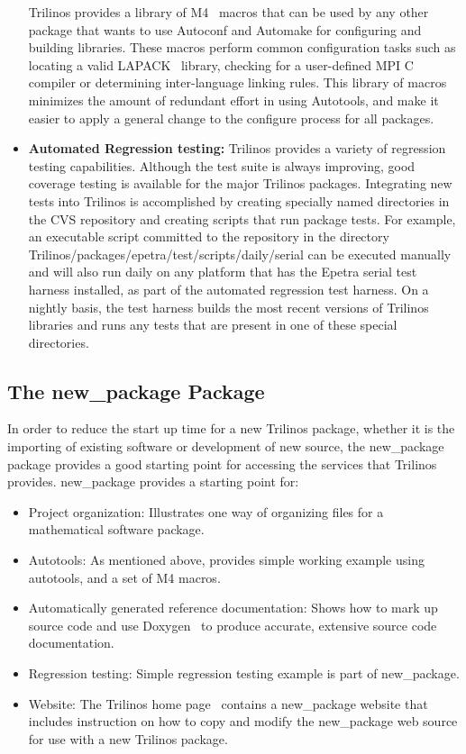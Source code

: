 \documentclass[acmtoms,acmnow]{acmtrans2m}
\begin{document}
\begin{itemize}
Trilinos provides a library of M4~\cite{M4} macros that can be used by any other
package that wants to use Autoconf and Automake for configuring and
building libraries.  These macros perform common configuration tasks such as
locating a valid LAPACK~\cite{lapack} library, checking for a
user-defined MPI C compiler or determining inter-language linking
rules.  This library of macros minimizes the amount of redundant
 effort in using Autotools, and make it easier to apply a general change to
the configure process for all packages.

\item {\bf Automated Regression testing:} Trilinos provides a variety of regression
testing capabilities.  Although the test suite is always improving,
good coverage testing is available for the major Trilinos packages.
Integrating new tests into Trilinos is accomplished by creating
specially named directories in the CVS repository and creating scripts
that run package tests.  For example, an executable script committed
to the repository in the directory 
Trilinos/packages/epetra/test/scripts/daily/serial can be executed manually and
will also run daily on any platform that has the Epetra serial test harness
installed, as part of the automated regression test harness.  On a nightly 
basis, the test harness builds the most recent versions of Trilinos libraries 
and runs any tests that are present in one of these special directories.  
\end{itemize}

\subsection{The new\_package Package} 

In order to reduce the start up time for a new Trilinos package,
whether it is the importing of existing software or development of new
source, the new\_package package provides a good starting point for
accessing the services that Trilinos provides.
new\_package provides a
starting point for:
\begin{itemize}
\item Project organization:  Illustrates one way of
organizing files for a mathematical software package.
\item Autotools: As mentioned above, provides simple working example
using autotools, and a set of M4 macros.
\item Automatically generated reference documentation: Shows how
to mark up source code and use Doxygen~\cite{Doxygen} to produce
accurate, extensive source code documentation.
\item Regression testing: Simple regression testing example is part of
new\_package.
\item Website: The Trilinos home page~\cite{Trilinos-home-page}
contains a new\_package website that includes instruction on how to
copy and modify the new\_package web source for use with a new
Trilinos package.
\end{itemize}
\end{document}
